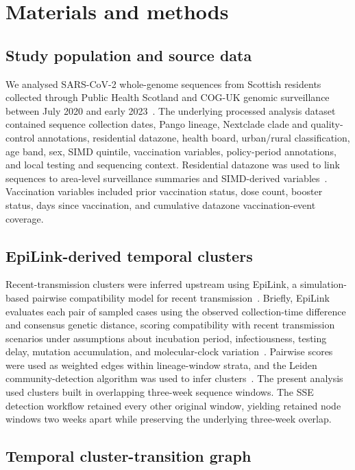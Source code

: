\documentclass[10pt,letterpaper]{article}
\begin{document}
\section*{Materials and methods}

\subsection*{Study population and source data}

We analysed SARS-CoV-2 whole-genome sequences from Scottish residents collected through Public Health Scotland and COG-UK genomic surveillance between July 2020 and early 2023~\cite{COGUK2020,daSilvaFilipe2021}. The underlying processed analysis dataset contained sequence collection dates, Pango lineage, Nextclade clade and quality-control annotations, residential datazone, health board, urban/rural classification, age band, sex, SIMD quintile, vaccination variables, policy-period annotations, and local testing and sequencing context. Residential datazone was used to link sequences to area-level surveillance summaries and SIMD-derived variables~\cite{ScottishSIMD2020}. Vaccination variables included prior vaccination status, dose count, booster status, days since vaccination, and cumulative datazone vaccination-event coverage.

\subsection*{EpiLink-derived temporal clusters}

Recent-transmission clusters were inferred upstream using EpiLink, a simulation-based pairwise compatibility model for recent transmission~\cite{ArthurEpiLink2026}. Briefly, EpiLink evaluates each pair of sampled cases using the observed collection-time difference and consensus genetic distance, scoring compatibility with recent transmission scenarios under assumptions about incubation period, infectiousness, testing delay, mutation accumulation, and molecular-clock variation~\cite{Hart2021,McAloon2020,Hart2022,Duchene2020}. Pairwise scores were used as weighted edges within lineage-window strata, and the Leiden community-detection algorithm was used to infer clusters~\cite{Traag2019}. The present analysis used clusters built in overlapping three-week sequence windows. The SSE detection workflow retained every other original window, yielding retained node windows two weeks apart while preserving the underlying three-week overlap.

\subsection*{Temporal cluster-transition graph}
\end{document}
